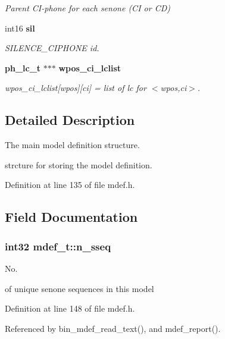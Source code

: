 \begin{DoxyCompactItemize}
\begin{DoxyCompactList}\small\item\em Parent C\-I-\/phone for each senone (C\-I or C\-D) \end{DoxyCompactList}\item 
int16 {\bf sil}\label{structmdef__t_acc9a57b57bbecaef55cc72be57b875f6}

\begin{DoxyCompactList}\small\item\em S\-I\-L\-E\-N\-C\-E\-\_\-\-C\-I\-P\-H\-O\-N\-E id. \end{DoxyCompactList}\item 
{\bf ph\-\_\-lc\-\_\-t} $\ast$$\ast$$\ast$ {\bf wpos\-\_\-ci\-\_\-lclist}
\begin{DoxyCompactList}\small\item\em wpos\-\_\-ci\-\_\-lclist[wpos][ci] = list of lc for $<$wpos,ci$>$. \end{DoxyCompactList}\end{DoxyCompactItemize}


\subsection{Detailed Description}
The main model definition structure. 

strcture for storing the model definition. 

Definition at line 135 of file mdef.\-h.



\subsection{Field Documentation}
\subsubsection[{n\-\_\-sseq}]{\setlength{\rightskip}{0pt plus 5cm}int32 mdef\-\_\-t\-::n\-\_\-sseq}\label{structmdef__t_ad9afd537734fe1f336e20218da28fb2c}


No. 

of unique senone sequences in this model 

Definition at line 148 of file mdef.\-h.



Referenced by bin\-\_\-mdef\-\_\-read\-\_\-text(), and mdef\-\_\-report().

